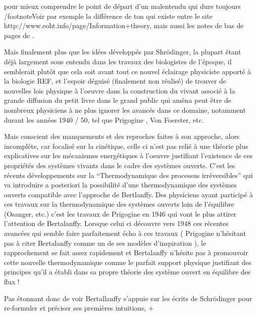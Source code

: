 \autocite{Triclot2007} pour mieux comprendre le point de départ d'un malentendu qui dure toujours /footnote{Voir par exemple la différence de ton qui existe entre le site http://www.eoht.info/page/Information+theory, mais aussi les notes de bas de pages de \autocite[277]{Lemoigne1977} }. 

\autocite[482]{Pouvreau2013} Mais finalement plus que les idées développés par Shrödinger, la plupart étant déjà largement sous entendu dans les travaux des biologistes de l'époque, il semblerait plutôt que cela soit avant tout ce nouvel éclairage physiciste apporté à la biologie {REF}, et l'espoir déguisé (finalement non réalisé) de trouver de nouvelles lois physique à l'oeuvre dans la construction du vivant associé à la grande diffusion du petit livre dans le grand public qui amèna peut être de nombreux physiciens à ne plus ignorer les avancés dans ce domaine, notamment durant les années 1940 / 50, tel que Prigogine \autocite[77]{Prigogine1996}, Von Foerster, etc. \autocite[73]{Lemoigne1977} 

Mais conscient des manquements et des reproches faites à son approche, alors incomplète, car focalisé sur la cinétique, celle ci n'est pas relié à une théorie plus explicatives sur les mécanismes energétiques à l'oeuvre justifiant l'existence de ces propriétés des systèmes vivants dans le cadre des systèmes ouverts. C'est les récents développements sur la \enquote{Thermodynamique des processus irréversibles} qui va introduire a posteriori la possibilité d'une thermodynamique des systèmes ouverts compatible avec l'approche de Bertlanffy. Des physiciens ayant participé à ces travaux sur la thermodynamique des systèmes ouverts loin de l'équilibre (Osanger, etc.) c'est les travaux de Prigogine  en 1946 \autocite{Prigogine1946} qui vont le plus attirer l'attention de Bertalanffy. Lorsque celui ci découvre vers 1948 ces récentes avancées qui semble faire parfaitement écho à ces travaux ( Prigogine n'hésitant pas à citer Bertalanffy comme un de ses modèles d'inspiration \autocite{Prigogine1996}), le rapprochement se fait assez rapidement et Bertalanffy n'hésite pas à promouvoir cette nouvelle thermodynamique comme le parfait support physique justifiant des principes qu'il a établi dans sa propre théorie des système ouvert en équilibre des flux ! \autocite[653-658]{Pouvreau2013}

Pas étonnant donc de voir Bertallanffy s'appuie sur les écrits de Schrödinger pour re-formuler et préciser ses premières intuitions, 
+

